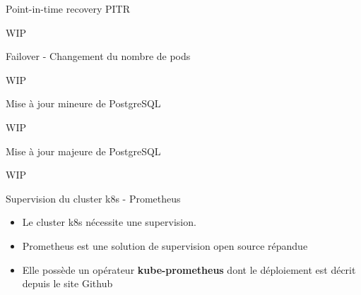 
\begin{frame}[fragile]{Point-in-time recovery PITR}

   WIP

\end{frame}


\begin{frame}[fragile]{Failover - Changement du nombre de pods}

   WIP

\end{frame}


\begin{frame}[fragile]{Mise à jour mineure de PostgreSQL}

   WIP

\end{frame}


\begin{frame}[fragile]{Mise à jour majeure de PostgreSQL}

   WIP

\end{frame}


\begin{frame}[fragile]{Supervision du cluster k8s - Prometheus}

\begin{itemize}
   \item Le cluster k8s nécessite une supervision.
   \item Prometheus est une solution de supervision open source répandue
   \item Elle possède un opérateur \textbf{kube-prometheus} dont le déploiement est décrit depuis le site Github
\end{itemize}

\end{frame}


